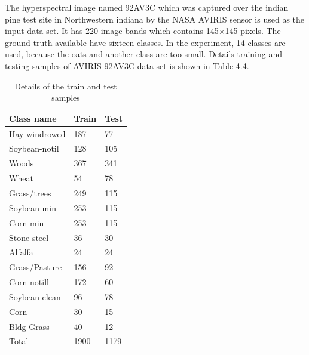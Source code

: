 \documentclass[document.tex]{subfiles}
\begin{document}
The hyperspectral image named 92AV3C which was captured over the indian pine test site in Northwestern indiana by the NASA AVIRIS sensor\cite{30} is used as the input data set. It has 220 image bands which contains 145$\times$145 pixels. The ground truth available have sixteen classes. In the experiment, 14 classes are used, because the oats and another class are too small. Details training and testing samples of AVIRIS 92AV3C data set is shown in Table 4.4.
\begin{table}[H]
	\caption{Details of the train and test samples}
	\begin{center}
		\begin{tabular}{|l|l|l|}
			\hline
			Class name & Train & Test\\ \hline
			Hay-windrowed & 187 & 77\\ \hline
			Soybean-notil & 128 & 105\\ \hline
			Woods & 367 & 341\\ \hline
			Wheat & 54 & 78\\ \hline
			Grass/trees & 249 & 115\\ \hline
			Soybean-min & 253 & 115\\ \hline
			Corn-min & 253 & 115\\ \hline
			Stone-steel & 36 & 30\\ \hline
			Alfalfa & 24 & 24\\ \hline
			Grass/Pasture & 156 & 92\\ \hline
			Corn-notill & 172 & 60\\ \hline
			Soybean-clean & 96 & 78\\ \hline
			Corn & 30 & 15\\ \hline
			Bldg-Grass & 40 & 12\\ \hline
			Total & 1900 & 1179\\ \hline
		\end{tabular}
	\end{center}
	\label{tab:Details of the train and test samples}
\end{table}
\end{document}
